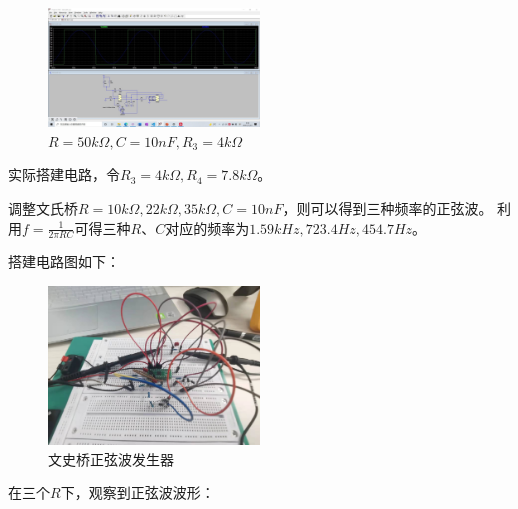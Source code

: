 \documentclass[UTF8]{ctexart}
\begin{document}
\begin{figure}[H]
        \centering
        \includegraphics[width = 0.5\textwidth]{1-1-50k-10n-4.jpg}
        \caption{$R = 50k \Omega, C = 10nF, R_3 = 4 k \Omega$}
\end{figure}

实际搭建电路，令$R_3 = 4k \Omega, R_4 = 7.8 k\Omega$。

调整文氏桥$R = 10k \Omega, 22 k\Omega, 35 k\Omega, C = 10nF$，则可以得到三种频率的正弦波。
利用$f = \frac{1}{2 \pi R C}$可得三种$R、C$对应的频率为$1.59kHz, 723.4Hz, 454.7Hz$。

搭建电路图如下：

\begin{figure}[H]
        \centering
        \includegraphics[width = 0.5\textwidth]{1-1-r.jpg}
        \caption{文史桥正弦波发生器}
\end{figure}

在三个$R$下，观察到正弦波波形：
\end{document}
